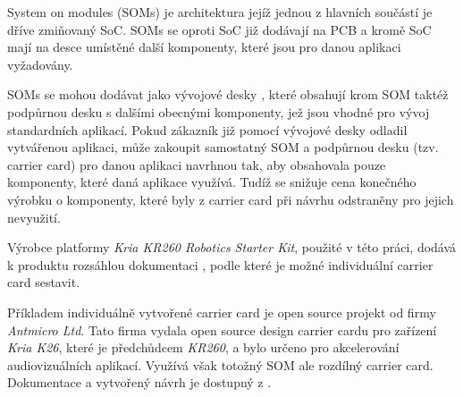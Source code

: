 \documentclass[a4paper, twoside, 11pt]{article}
\begin{document}
	System on modules (SOMs) je architektura jejíž jednou z hlavních součástí je dříve zmiňovaný SoC. SOMs se oproti SoC již dodávají na PCB a kromě SoC mají na desce umístěné další komponenty, které jsou pro danou aplikaci vyžadovány. \cite{xilinx-what-is-a-som}\par
	SOMs se mohou dodávat jako vývojové desky \cite{xilinx-kria-kr260-robotics-starter-kit}, které obsahují krom SOM taktéž podpůrnou desku s dalšími obecnými komponenty, jež jsou vhodné pro vývoj standardních aplikací. Pokud zákazník již pomocí vývojové desky odladil vytvářenou aplikaci, může zakoupit samostatný SOM a podpůrnou desku (tzv. carrier card) pro danou aplikaci navrhnou tak, aby obsahovala pouze komponenty, které daná aplikace využívá. Tudíž se snižuje cena konečného výrobku o komponenty, které byly z carrier card při návrhu odstraněny pro jejich nevyužití.\par
	Výrobce platformy \textit{Kria KR260 Robotics Starter Kit}, použité v této práci, dodává k produktu rozsáhlou dokumentaci \cite{kria-som-carrier-card-design-guide-2022} \cite{kria-k26-som-ds}, podle které je možné individuální carrier card sestavit. \par
	Příkladem individuálně vytvořené carrier card je open source projekt od firmy \textit{Antmicro Ltd}. Tato firma vydala open source design carrier cardu pro zařízení \textit{Kria K26}, které je předchůdcem \textit{KR260}, a bylo určeno pro akcelerování audiovizuálních aplikací. Využívá však totožný SOM ale rozdílný carrier card. Dokumentace a vytvořený návrh je dostupný z \cite{antmicro-open-source-kria-k26-carrier-card}.
\end{document}
